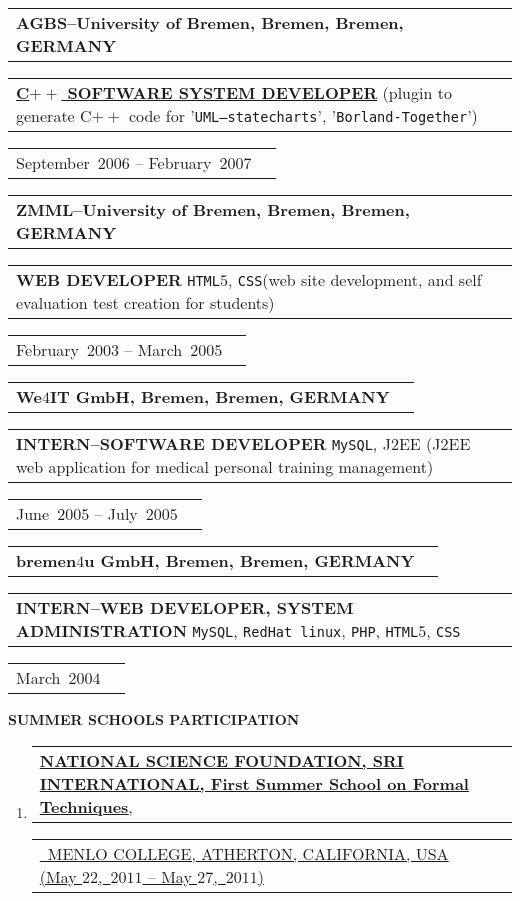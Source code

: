 \documentclass[9pt,a4paper]{article} %
\makeatletter
\newcommand{\headerrow}[2]
{\begin{tabular*}{\linewidth}{l@{\extracolsep{\fill}}r}
	#1 &
	#2 \\
\end{tabular*}}
\newcommand{\headerrowONE}[1]{\headerrow{#1}{}}
\newcommand{\cplusplus}{C$++$\xspace}
\newcommand{\css}{\texttt{CSS}\xspace}
\newcommand{\html}{\texttt{HTML$5$}\xspace}
\newcommand{\jtwoee}{J$2$EE\xspace}
\newcommand{\php}{\texttt{PHP}\xspace}
\newcommand{\mysql}{\texttt{MySQL}\xspace}
\newcommand{\redhat}{\texttt{RedHat~linux}\xspace}
\newcommand{\cvitemdate}[2]{#1~$#2$\xspace}
\newcommand{\cvitempositionheld}[1]{\textbf{#1}\xspace}
\makeatother
\begin{document}
\vspace{0.3em}

\headerrowONE{\textbf{AGBS--University of Bremen, Bremen, Bremen, GERMANY}}	
\headerrowONE{\href{http://www.informatik.uni-bremen.de/agbs/jp/papers/peleska_et_al_soqua2006.pdf}{\cvitempositionheld{\cplusplus SOFTWARE SYSTEM DEVELOPER}}
(plugin to generate \cplusplus code for '\texttt{UML--statecharts}',
'\texttt{Borland-Together}')}
\headerrowONE{\cvitemdate{September}{2006} -- \cvitemdate{February}{2007}}	

\vspace{0.3em}

\headerrowONE{\textbf{ZMML--University of Bremen, Bremen, Bremen, GERMANY}}	
\headerrowONE{\cvitempositionheld{WEB DEVELOPER} \html, \css (web site development,
and self evaluation test creation for students)}
\headerrowONE{\cvitemdate{February}{2003} -- \cvitemdate{March}{2005}}	

\vspace{0.3em}

\headerrowONE{\textbf{We$4$IT GmbH, Bremen, Bremen, GERMANY}}	
\headerrowONE{\cvitempositionheld{INTERN--SOFTWARE DEVELOPER} \mysql, \jtwoee
(\jtwoee web application for medical personal training management)}
\headerrowONE{\cvitemdate{June}{2005} -- \cvitemdate{July}{2005}}
	
\vspace{0.3em}

\headerrowONE{\textbf{bremen$4$u GmbH, Bremen, Bremen, GERMANY}}	
\headerrowONE{\cvitempositionheld{INTERN--WEB DEVELOPER, SYSTEM ADMINISTRATION} \mysql, \redhat, \php,
\html, \css}
\headerrowONE{\cvitemdate{March}{2004}}	

\vspace{2em}

\newpage


\begin{center}
{\large \textbf{SUMMER SCHOOLS PARTICIPATION}}
\end{center}

\vspace{0.5em}

\begin{enumerate}
	\item \headerrowONE{\href{http://fm.csl.sri.com/SSFT11/}{\textbf{NATIONAL SCIENCE FOUNDATION, SRI INTERNATIONAL, First Summer School on Formal Techniques},}}
			\headerrowONE{\href{http://fm.csl.sri.com/SSFT11}{\ \hfill  MENLO COLLEGE, ATHERTON, 
			CALIFORNIA, USA (\cvitemdate{May $22$,}{2011} -- \cvitemdate{May $27$,}{2011})}}

\end{enumerate}
\end{document}
